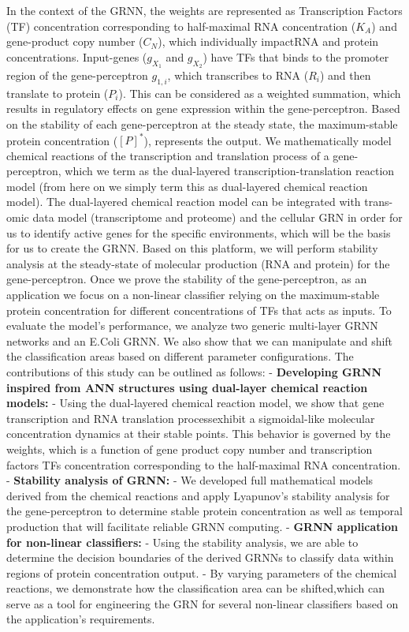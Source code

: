 \documentclass[twocolumn]{biophys-new}
\begin{document}
{{In the context of the GRNN, the weights are represented as Transcription Factors (TF) concentration corresponding to half-maximal RNA concentration ($K_A$) and gene-product copy number ($C_N$), which individually impactRNA and protein concentrations. Input-genes ($g_{X_1}$ and $g_{X_2}$) have TFs that binds to the promoter region of the gene-perceptron $g_{1,i}$, which transcribes to RNA ($R_i$) and then translate to protein ($P_i$). This can be considered as a weighted summation, which results in regulatory effects on gene expression within the gene-perceptron. Based on the stability of each gene-perceptron at the steady state, the maximum-stable protein concentration ($[P]^*$), represents the output. 
We mathematically model chemical reactions of the transcription and translation process of a gene-perceptron, which we term as the dual-layered transcription-translation reaction model (from here on we simply term this as dual-layered chemical reaction model). The dual-layered chemical reaction model can be integrated with trans-omic data model (transcriptome and proteome) and the cellular GRN in order for us to identify active genes for the specific environments, which will be the basis for us to create the GRNN. 
Based on this platform, we will perform stability analysis at the steady-state of molecular production (RNA and protein) for the gene-perceptron. Once we prove the stability of the gene-perceptron, as an application we focus on a non-linear classifier relying on the maximum-stable protein concentration for different concentrations of TFs that acts as inputs. To evaluate the model's performance, we analyze two generic multi-layer GRNN networks and an E.Coli GRNN. 
We also show that we can manipulate and shift the classification areas based on different parameter configurations.
The contributions of this study can be outlined as follows: 
-  \textbf{Developing GRNN inspired from ANN structures using dual-layer chemical reaction models:}
- Using the dual-layered chemical reaction model, we show that gene transcription and RNA translation processexhibit a sigmoidal-like molecular concentration dynamics at their stable points. This behavior is governed by the weights, which is a function of gene product copy number and transcription factors TFs concentration corresponding to the half-maximal RNA concentration.
-  \textbf{Stability analysis of GRNN:}
- We developed full mathematical models derived from the chemical reactions and apply Lyapunov's stability analysis for the gene-perceptron to determine stable protein concentration as well as temporal production that will facilitate reliable GRNN computing.
-  \textbf{GRNN application for non-linear classifiers:}
- Using the stability analysis, we are able to determine the decision boundaries of the derived GRNNs to classify data within regions of protein concentration output.
- By varying parameters of the chemical reactions, we demonstrate how the classification area can be shifted,which can serve as a tool for engineering the GRN for several non-linear classifiers based on the application's requirements.

}}
\end{document}
